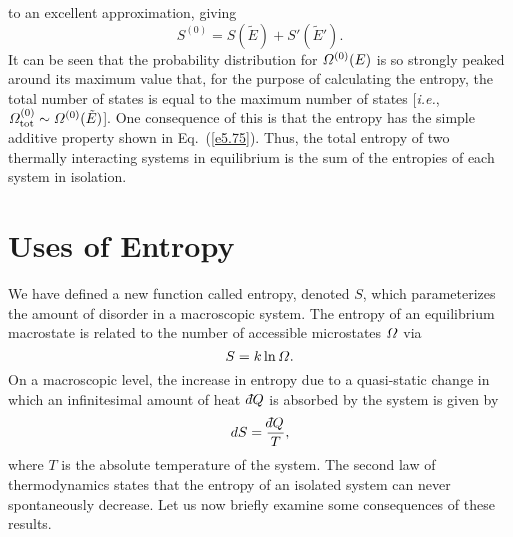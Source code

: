 to an excellent approximation,
giving
\begin{equation}
S^{(0)} = S(\tilde{E}) + S'(\tilde{E}').\label{e5.75}
\end{equation}
It can be seen that the probability distribution  for ${\mit\Omega}^{(0)}(E)$
is so strongly peaked
around its maximum value that, for the purpose of calculating the entropy, the
total number of states is equal to the maximum number of states [{\em i.e.}, 
${\mit\Omega}_{\rm tot}^{(0)}\sim {\mit\Omega}^{(0)}(\tilde{E})$].
One consequence
of this is that the entropy has the simple additive property shown in
Eq.~(\ref{e5.75}). Thus, the total entropy of two thermally interacting systems
in equilibrium is the sum of the entropies of each system in isolation. 

\section{Uses of Entropy}\label{s5.8}
We have defined a new function called  entropy,  denoted $S$, 
 which parameterizes  the amount of disorder in  a macroscopic
system. The entropy of an equilibrium 
 macrostate
is related to the number of accessible microstates ${\mit\Omega}$ via
\begin{equation}
S = k \ln {\mit\Omega}.\label{e5.76}
\end{equation}
On a macroscopic level, the increase in entropy due to a quasi-static change
in which an infinitesimal amount of heat $\,\dbar Q$ is absorbed by the system is
given by
\begin{equation}
dS =\frac{\dbar Q}{T},
\end{equation}
where $T$ is the absolute temperature of the system.
The second law of thermodynamics states that the entropy of an isolated system
can never spontaneously decrease. Let us now briefly examine some  consequences
of these results.


